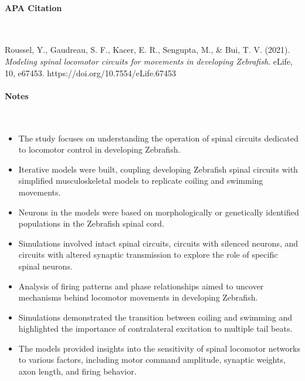 \newpage

\vspace*{-0.5cm}
\paragraph{APA Citation} \

\begin{hangparas}{.25in}{1}
Roussel, Y., Gaudreau, S. F., Kacer, E. R., Sengupta, M., \& Bui, T. V. (2021). \textit{Modeling spinal locomotor circuits for movements in developing Zebrafish}. eLife, 10, e67453. https://doi.org/10.7554/eLife.67453
\end{hangparas}

\vspace*{-0.5cm}
\paragraph{Notes} \

\begin{itemize}
    \item The study focuses on understanding the operation of spinal circuits dedicated to locomotor control in developing Zebrafish.
    \item Iterative models were built, coupling developing Zebrafish spinal circuits with simplified musculoskeletal models to replicate coiling and swimming movements.
    \item Neurons in the models were based on morphologically or genetically identified populations in the Zebrafish spinal cord.
    \item Simulations involved intact spinal circuits, circuits with silenced neurons, and circuits with altered synaptic transmission to explore the role of specific spinal neurons.
    \item Analysis of firing patterns and phase relationships aimed to uncover mechanisms behind locomotor movements in developing Zebrafish.
    \item Simulations demonstrated the transition between coiling and swimming and highlighted the importance of contralateral excitation to multiple tail beats.
    \item The models provided insights into the sensitivity of spinal locomotor networks to various factors, including motor command amplitude, synaptic weights, axon length, and firing behavior.
\end{itemize}
    
\vspace*{-0.5cm}

